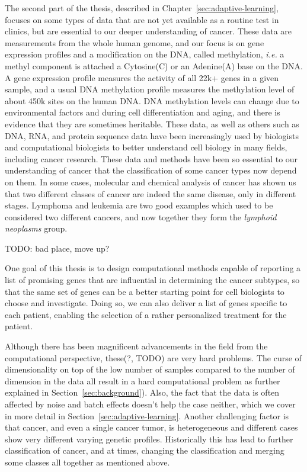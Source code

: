 The second part of the thesis, described in
Chapter~\ref{sec:adaptive-learning}, focuses on some types of data that are not
yet available as a routine test in clinics, but are essential to our deeper
understanding of cancer. These data are measurements from the whole human
genome, and our focus is on gene expression profiles and a modification on the
DNA, called methylation, \emph{i.e.} a methyl component is attached a
Cytosine(C) or an Adenine(A) base on the DNA. A gene expression profile
measures the activity of all 22k+ genes in a given sample, and a usual DNA
methylation profile measures the methylation level of about 450k sites on the
human DNA. DNA methylation levels can change due to environmental factors and
during cell differentiation and aging, and there is evidence that they are
sometimes heritable. These data, as well as others such as DNA, RNA, and
protein sequence data have been increasingly used by biologists and
computational biologists to better understand cell biology in many fields,
including cancer research. These data and methods have been so essential to our
understanding of cancer that the classification of some cancer types now depend
on them. In some cases, molecular and chemical analysis of cancer has shown us
that two different classes of cancer are indeed the same disease, only in
different stages. Lymphoma and leukemia are two good examples which used to be
considered two different cancers, and now together they form the \emph{lymphoid
  neoplasms} group.

TODO: bad place, move up?

One goal of this thesis is to design computational methods capable of reporting
a list of promising genes that are influential in determining the cancer
subtypes, so that the same set of genes can be a better starting point for cell
biologists to choose and investigate. Doing so, we can also deliver a list of
genes specific to each patient, enabling the selection of a rather personalized
treatment for the patient.

Although there has been magnificent advancements in the field from the
computational perspective, these(?, TODO) are very hard problems. The curse of
dimensionality on top of the low number of samples compared to the number of
dimension in the data all result in a hard computational problem as further
explained in Section~\ref{sec:background}). Also, the fact that the data is
often affected by noise and batch effects doesn't help the case neither, which
we cover in more detail in Section~\ref{sec:adaptive-learning}. Another
challenging factor is that cancer, and even a single cancer tumor, is
heterogeneous and different cases show very different varying genetic profiles.
Historically this has lead to further classification of cancer, and at times,
changing the classification and merging some classes all together as mentioned
above.


